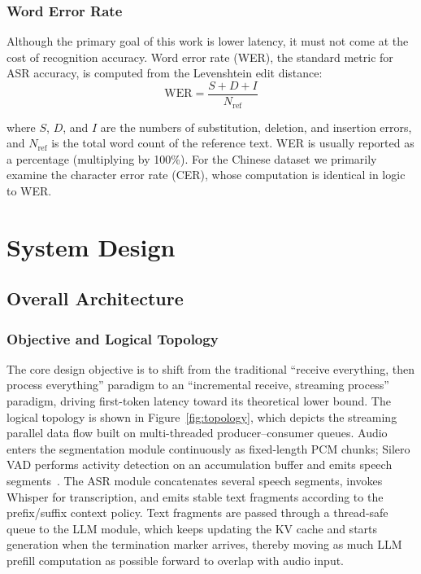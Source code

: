 \documentclass[pdflatex,iicol,Numbered,sn-basic]{sn-jnl}%
\begin{document}
\subsubsection{Word Error Rate}

Although the primary goal of this work is lower latency, it must not come at the cost of recognition accuracy. Word error rate (WER), the standard metric for ASR accuracy, is computed from the Levenshtein edit distance:
\begin{equation}
\mathrm{WER}=\frac{S+D+I}{N_{\mathrm{ref}}}
\label{eq:wer}
\end{equation}

where $S$, $D$, and $I$ are the numbers of substitution, deletion, and insertion errors, and $N_{\mathrm{ref}}$ is the total word count of the reference text. WER is usually reported as a percentage (multiplying by 100\%). For the Chinese dataset we primarily examine the character error rate (CER), whose computation is identical in logic to WER.

\section{System Design}\label{sec:design}

\subsection{Overall Architecture}

\subsubsection{Objective and Logical Topology}

The core design objective is to shift from the traditional ``receive everything, then process everything'' paradigm to an ``incremental receive, streaming process'' paradigm, driving first-token latency toward its theoretical lower bound. The logical topology is shown in Figure~\ref{fig:topology}, which depicts the streaming parallel data flow built on multi-threaded producer--consumer queues. Audio enters the segmentation module continuously as fixed-length PCM chunks; Silero VAD performs activity detection on an accumulation buffer and emits speech segments~\cite{ref13}. The ASR module concatenates several speech segments, invokes Whisper for transcription, and emits stable text fragments according to the prefix/suffix context policy. Text fragments are passed through a thread-safe queue to the LLM module, which keeps updating the KV cache and starts generation when the termination marker arrives, thereby moving as much LLM prefill computation as possible forward to overlap with audio input.
\end{document}
